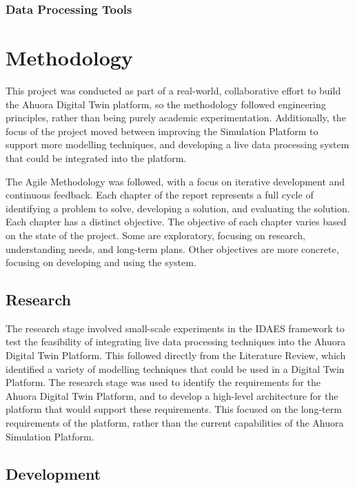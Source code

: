 \documentclass[12pt]{report}
\begin{document}
\subsection{Data Processing Tools}


\chapter{Methodology}

This project was conducted as part of a real-world, collaborative effort to build the Ahuora Digital Twin platform, so the methodology followed engineering principles, rather than being purely academic experimentation. Additionally, the focus of the project moved between improving the Simulation Platform to support more modelling techniques, and developing a live data processing system that could be integrated into the platform.

The Agile Methodology was followed, with a focus on iterative development and continuous feedback. Each chapter of the report represents a full cycle of identifying a problem to solve, developing a solution, and evaluating the solution. Each chapter has a distinct objective. The objective of each chapter varies based on the state of the project. Some are exploratory, focusing on research, understanding needs, and long-term plans. Other objectives are more concrete, focusing on developing and using the system. 



\section{Research}

The research stage involved small-scale experiments in the IDAES framework to test the feasibility of integrating live data processing techniques into the Ahuora Digital Twin Platform. This followed directly from the Literature Review, which identified a variety of modelling techniques that could be used in a Digital Twin Platform. The research stage was used to identify the requirements for the Ahuora Digital Twin Platform, and to develop a high-level architecture for the platform that would support these requirements. This focused on the long-term requirements of the platform, rather than the current capabilities of the Ahuora Simulation Platform.

\section{Development}
\end{document}
